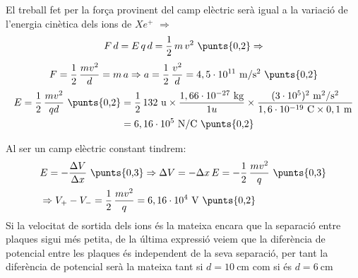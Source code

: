 \begin{solapartat}
El treball fet per la força provinent del camp elèctric serà igual a la variació de l'energia cinètica dels ions de $Xe^{+}$  $\Rightarrow$
\[ F\,d = E\,q\,d = \frac{1}{2}\,m\,v^2 \ \text{\punts{0,2}} \Rightarrow \]
\[ F = \frac{1}{2}\,\frac{mv^2}{d} = m\,a \Rightarrow a = \frac{1}{2}\,\frac{v^2}{d} = 4,5\cdot 10^{11}\ \mathrm{m/s^2} \ \text{\punts{0,2}} \]
\begin{align*}
E = \frac{1}{2}\,\frac{mv^2}{qd} \ \text{\punts{0,2}} &= \frac{1}{2}\,132\ \mathrm{u}\times\frac{1,66\cdot 10^{-27}\ \mathrm{kg}}{1u}\times\frac{(3\cdot 10^{5})^2\ \mathrm{m^2/s^2}}{1,6\cdot 10^{-19}\ \mathrm{C}\times 0,1\ \mathrm{m}}\\
&= 6,16\cdot 10^{5}\ \mathrm{N/C} \ \text{\punts{0,2}}
\end{align*}
\end{solapartat}

\begin{solapartat}
Al ser un camp elèctric constant tindrem:
\begin{align*}
&E = -\frac{\Delta V}{\Delta x} \ \text{\punts{0,3}} \Rightarrow \Delta V = -\Delta x\,E = -\frac{1}{2}\,\frac{mv^2}{q} \ \text{\punts{0,3}}\\
&\Rightarrow V_+ - V_- = \frac{1}{2}\,\frac{mv^2}{q} = 6,16\cdot 10^{4}\ \mathrm{V} \ \text{\punts{0,2}}
\end{align*}
Si la velocitat de sortida dels ions és la mateixa encara que la separació entre plaques sigui més petita, de la última expressió veiem que la diferència de potencial entre les plaques és independent de la seva separació, per tant la diferència de potencial serà la mateixa tant si $d = 10\ \mathrm{cm}$ com si és $d = 6\ \mathrm{cm}$ 
\end{solapartat}
